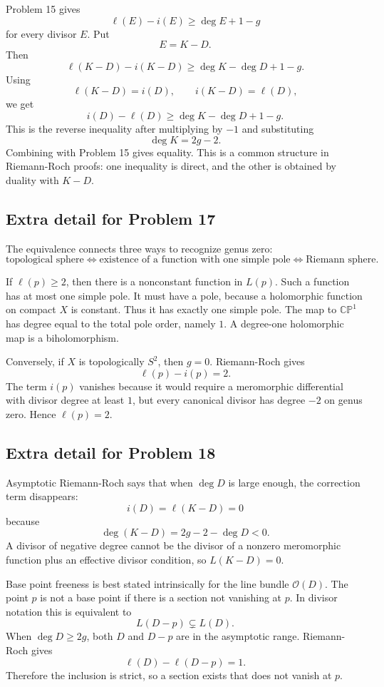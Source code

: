 \documentclass[11pt]{article}
\newcommand{\CP}{\mathbb{CP}}
\begin{document}
Problem 15 gives
\[
 \ell(E)-i(E)\geq\deg E+1-g
\]
for every divisor $E$. Put
\[
 E=K-D.
\]
Then
\[
 \ell(K-D)-i(K-D)\geq \deg K-\deg D+1-g.
\]
Using
\[
 \ell(K-D)=i(D),\qquad i(K-D)=\ell(D),
\]
we get
\[
 i(D)-\ell(D)\geq \deg K-\deg D+1-g.
\]
This is the reverse inequality after multiplying by $-1$ and substituting
\[
 \deg K=2g-2.
\]
Combining with Problem 15 gives equality. This is a common structure in Riemann-Roch proofs: one inequality is direct, and the other is obtained by duality with $K-D$.

\subsection*{Extra detail for Problem 17}

The equivalence connects three ways to recognize genus zero:
\[
 \text{topological sphere}
 \Longleftrightarrow
 \text{existence of a function with one simple pole}
 \Longleftrightarrow
 \text{Riemann sphere}.
\]

If $\ell(p)\geq2$, then there is a nonconstant function in $L(p)$. Such a function has at most one simple pole. It must have a pole, because a holomorphic function on compact $X$ is constant. Thus it has exactly one simple pole. The map to $\CP^1$ has degree equal to the total pole order, namely $1$. A degree-one holomorphic map is a biholomorphism.

Conversely, if $X$ is topologically $S^2$, then $g=0$. Riemann-Roch gives
\[
 \ell(p)-i(p)=2.
\]
The term $i(p)$ vanishes because it would require a meromorphic differential with divisor degree at least $1$, but every canonical divisor has degree $-2$ on genus zero. Hence $\ell(p)=2$.

\subsection*{Extra detail for Problem 18}

Asymptotic Riemann-Roch says that when $\deg D$ is large enough, the correction term disappears:
\[
 i(D)=\ell(K-D)=0
\]
because
\[
 \deg(K-D)=2g-2-\deg D<0.
\]
A divisor of negative degree cannot be the divisor of a nonzero meromorphic function plus an effective divisor condition, so $L(K-D)=0$.

Base point freeness is best stated intrinsically for the line bundle $\mathcal O(D)$. The point $p$ is not a base point if there is a section not vanishing at $p$. In divisor notation this is equivalent to
\[
 L(D-p)\subsetneq L(D).
\]
When $\deg D\geq2g$, both $D$ and $D-p$ are in the asymptotic range. Riemann-Roch gives
\[
 \ell(D)-\ell(D-p)=1.
\]
Therefore the inclusion is strict, so a section exists that does not vanish at $p$.
\end{document}
